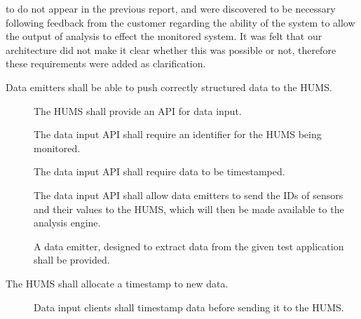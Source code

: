  to  do not appear in the previous report, and were discovered to be necessary following feedback from the customer regarding the ability of the system to allow the output of analysis to effect the monitored system. It was felt that our architecture did not make it clear whether this was possible or not, therefore these requirements were added as clarification.
\begin{description}[leftmargin=1.3cm, itemsep=0.3cm]
  	\item[\fr{1}]  Data emitters shall be able to push correctly structured data 	to the HUMS.
	\begin{description}
		 \item[] The HUMS shall provide an API for data input.

		  \item[] The data input API shall require an identifier for
 		 the HUMS being monitored.

 		 \item[] The data input API shall require data to be
 		 timestamped.

 		 \item[] The data input API shall allow data emitters
 		 to send the IDs of sensors and their values to the HUMS, which will 			then be made available to the analysis engine.

 		 \item[] A data emitter, designed to extract data from the given 		test application shall be provided.
	\end{description}
	\item[\fr{2}]  The HUMS shall allocate a timestamp to new data.
	\begin{description}
	 	 \item[]Data input clients shall timestamp data before
 		sending it to the HUMS.
		

\end{description}
\end{description}
